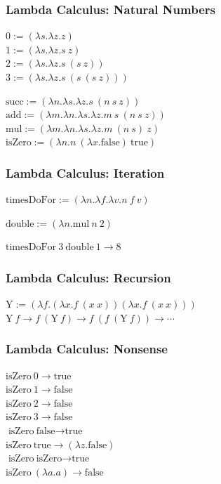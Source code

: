 \documentclass{beamer}
\newcommand{\true}{\text{true}}
\newcommand{\false}{\text{false}}
\begin{document}
\begin{frame}[fragile]
  \frametitle{Lambda Calculus: Natural Numbers}
  $ 0 := (\lambda s . \lambda z . z) $ \\
  $ 1 := (\lambda s . \lambda z . s\ z) $ \\
  $ 2 := (\lambda s . \lambda z . s\ (s\ z)) $ \\
  $ 3 := (\lambda s . \lambda z . s\ (s\ (s\ z))) $ \\

  \vspace{1cm}
  \pause

  $ \text{succ} := (\lambda n . \lambda s . \lambda z . s\ (n\ s\ z)) $ \\

  $ \text{add} := (\lambda m . \lambda n . \lambda s . \lambda z . m\ s\ (n\ s\ z)) $ \\
  $ \text{mul} := (\lambda m . \lambda n . \lambda s . \lambda z . m\ (n\ s)\ z) $ \\

  $ \text{isZero} := (\lambda n . n\ (\lambda x . \text{false})\ \text{true}) $ \\
\end{frame}

\begin{frame}[fragile]
  \frametitle{Lambda Calculus: Iteration}

  $ \text{timesDoFor} := (\lambda n. \lambda f.\lambda v. n\ f\ v) $

  $ \text{double} := (\lambda n. \text{mul}\ n\ 2) $

  $ \text{timesDoFor}\ 3\ \text{double}\ 1 \rightarrow 8$

\end{frame}


\begin{frame}[fragile]
  \frametitle{Lambda Calculus: Recursion}

  $ \text{Y} := (\lambda f. (\lambda x. f\ (x\ x)) (\lambda x. f\ (x\ x))) $ \\
  $ \text{Y}\ f \rightarrow f\ (\text{Y}\ f) \rightarrow f\ (f\ (\text{Y}\ f)) \rightarrow \cdots$
\end{frame}

\begin{frame}[fragile]
  \frametitle{Lambda Calculus: Nonsense}

  $ \text{isZero}\ 0 \rightarrow \true $ \\
  $ \text{isZero}\ 1 \rightarrow \false $ \\
  $ \text{isZero}\ 2 \rightarrow \false $ \\
  $ \text{isZero}\ 3 \rightarrow \false $ \\
  \pause
  $ \text{isZero}\ \false \rightarrow \true $ \\
  \pause
  $ \text{isZero}\ \true \rightarrow (\lambda z. \false) $ \\
  \pause
  $ \text{isZero}\ \text{isZero} \rightarrow \true $ \\
  \pause
  $ \text{isZero}\ (\lambda a . a) \rightarrow \false $ \\
\end{frame}
\end{document}
